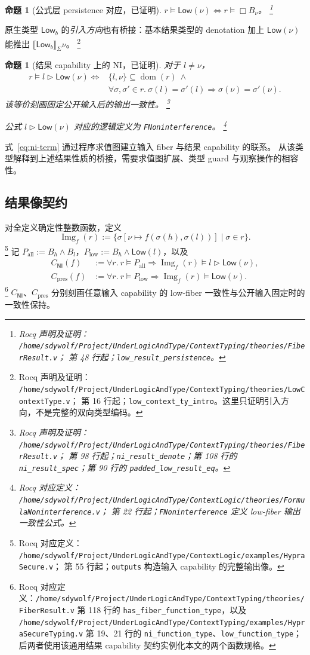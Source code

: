 \documentclass[UTF8,a4paper,11pt,fontset=fandol]{ctexart}
\newcommand{\dom}{\operatorname{dom}}
\newcommand{\Low}{\ensuremath{\mathsf{Low}}}
\newcommand{\NI}{\mathsf{NI}}
\newcommand{\Img}{\operatorname{Img}}
\newcommand{\Den}[1]{\llbracket #1\rrbracket}
\newcommand{\rocqnote}[3]{%
  \footnote{Rocq 声明及证明：
  \nolinkurl{/home/sdywolf/Project/UnderLogicAndType/#1}；
  第 #2 行起；#3。}}
\newcommand{\rocqdefnote}[3]{%
  \footnote{Rocq 对应定义：
  \nolinkurl{/home/sdywolf/Project/UnderLogicAndType/#1}；
  第 #2 行起；#3。}}
\newtheorem{proposition}[definition]{命题}
\begin{document}
\begin{proposition}[公式层 persistence 对应，已证明]
$r\models\Low(\nu)\Longleftrightarrow r\models\Box B_\nu$。\rocqnote{ContextTyping/theories/FiberResult.v}{48}{\texttt{low\_result\_persistence}}
\end{proposition}
原生类型 $\mathsf{Low}_b$ 的\emph{引入方向}也有桥接：基本结果类型的 denotation 加上
$\Low(\nu)$ 能推出 $\Den{\mathsf{Low}_b}_\Sigma\nu$。\rocqnote{ContextTyping/theories/LowContextType.v}{16}{\texttt{low\_context\_ty\_intro}。这里只证明引入方向，不是完整的双向类型编码}

\begin{proposition}[结果 capability 上的 NI，已证明]
对于 $l\ne\nu$，
\begin{align*}
 r\models l\triangleright\Low(\nu)\Longleftrightarrow {}&
 \{l,\nu\}\subseteq\dom(r)\ \land\\
 &\forall\sigma,\sigma'\in r.\
 \sigma(l)=\sigma'(l)\Longrightarrow\sigma(\nu)=\sigma'(\nu).
\end{align*}
该等价刻画固定公开输入后的输出一致性。\rocqnote{ContextTyping/theories/FiberResult.v}{98}{\texttt{ni\_result\_denote}；第 108 行的 \texttt{ni\_result\_spec}；第 90 行的 \texttt{padded\_low\_result\_eq}}

公式 $l\triangleright\Low(\nu)$ 对应的逻辑定义为 \texttt{FNoninterference}。\rocqdefnote{ContextLogic/theories/FormulaNoninterference.v}{22}{\texttt{FNoninterference} 定义 low-fiber 输出一致性公式}
\end{proposition}
式~\eqref{eq:ni-term} 通过程序求值图建立输入 fiber 与结果 capability 的联系。
从该类型解释到上述结果性质的桥接，需要求值图扩展、类型 guard 与观察操作的相容性。

\subsection{结果像契约}

对全定义确定性整数函数，定义
\[
 \Img_f(r):=\{\sigma[\nu\mapsto f(\sigma(h),\sigma(l))]\mid\sigma\in r\}.
\]
\rocqdefnote{ContextLogic/examples/HypraSecure.v}{55}{\texttt{outputs} 构造输入 capability 的完整输出像}
记 $P_{\mathrm{all}}:=B_h\land B_l$，$P_{\mathrm{low}}:=B_h\land\Low(l)$，以及
\begin{align*}
 C_{\NI}(f)&:=\forall r.\ r\models P_{\mathrm{all}}\Longrightarrow
                          \Img_f(r)\models l\triangleright\Low(\nu),\\
 C_{\mathrm{pres}}(f)&:=\forall r.\ r\models P_{\mathrm{low}}\Longrightarrow
                          \Img_f(r)\models\Low(\nu).
\end{align*}
\footnote{Rocq 对应定义：\nolinkurl{/home/sdywolf/Project/UnderLogicAndType/ContextTyping/theories/FiberResult.v} 第 118 行的 \texttt{has\_fiber\_function\_type}，以及 \nolinkurl{/home/sdywolf/Project/UnderLogicAndType/ContextTyping/examples/HypraSecureTyping.v} 第 19、21 行的 \texttt{ni\_function\_type}、\texttt{low\_function\_type}；后两者使用该通用结果 capability 契约实例化本文的两个函数规格。}
$C_{\NI}$、$C_{\mathrm{pres}}$ 分别刻画任意输入 capability 的 low-fiber 一致性与公开输入固定时的一致性保持。
\end{document}
